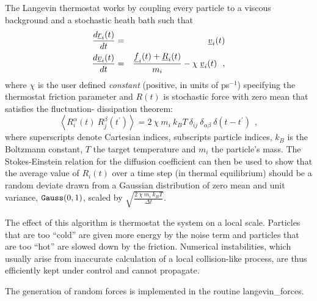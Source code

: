 The Langevin thermostat works by coupling every particle to a
viscous background and a stochastic heath bath such that
\begin{eqnarray}
{d \mbox{$\underline{r}$}_{i}(t) \over d t} &=& \mbox{$\underline{v}$}_{i}(t) \nonumber \\
{d \mbox{$\underline{v}$}_{i}(t) \over d t} &=& {{\mbox{$\underline{f}$}_{i}(t)+\mbox{$\underline{R}$}_{i}(t)} \over
m_{i}} - \chi \; \mbox{$\underline{v}$}_{i}(t)~~,
\end{eqnarray}
where $\chi$ is the user defined {\em constant} (positive, in units of
ps$^{-1}$) specifying the thermostat friction parameter and $R(t)$ is
stochastic force with zero mean that satisfies the fluctuation-
dissipation theorem:
\begin{equation}
\left< R^{\alpha}_{i}(t)~R^{\beta}_{j}(t^\prime)\right> =
2~\chi~m_{i}~k_{B}T~\delta_{ij}~\delta_{\alpha \beta}~\delta(t-t^\prime)~~, \label{langevin}
\end{equation}
where superscripts denote Cartesian indices, subscripts particle
indices, $k_{B}$ is the Boltzmann constant, $T$ the target
temperature and $m_{i}$ the particle's mass.  The Stokes-Einstein
relation for the diffusion coefficient can then be used to show
that the average value of $R_{i}(t)$ over a time step (in thermal
equilibrium) should be a random deviate drawn from a Gaussian
distribution of zero mean and unit variance, ${\tt Gauss}(0,1)$,
scaled by $\sqrt{\frac{2~\chi~m_{i}~k_{B}T}{\Delta t}}$.

The effect of this algorithm is thermostat the system on a local
scale.  Particles that are too ``cold'' are given more energy by
the noise term and particles that are too ``hot'' are slowed down
by the friction.  Numerical instabilities, which usually arise from
inaccurate calculation of a local collision-like process, are thus
efficiently kept under control and cannot propagate.

The generation of random forces is implemented in the routine
{\sc langevin\_forces}.

